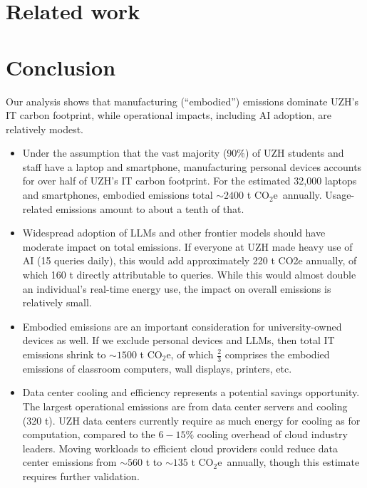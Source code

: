 \documentclass[11pt]{article}
\newcommand{\coe}{CO$_2$e}
\begin{document}
\section{Related work}
\label{sec:related:work}

\section{Conclusion}

Our analysis shows that manufacturing (“embodied”) emissions dominate UZH's IT carbon footprint, while operational impacts, including AI adoption, are relatively modest.

\begin{itemize}

  \item Under the assumption that the vast majority (90\%) of UZH students and staff have a laptop and smartphone, manufacturing personal devices accounts for over half of UZH's IT carbon footprint. For the estimated 32,000 laptops and smartphones, embodied emissions total $\sim 2400$ t \coe\ annually. Usage-related emissions amount to about a tenth of that.

  \item Widespread adoption of LLMs and other frontier models should have moderate impact on total emissions. If everyone at UZH made heavy use of AI (15 queries daily), this would add approximately 220 t CO2e annually, of which 160 t directly attributable to queries. While this would almost double an individual's real-time energy use, the impact on overall emissions is relatively small.

  \item Embodied emissions are an important consideration for university-owned devices as well. If we exclude personal devices and LLMs, then total IT emissions shrink to $\sim 1500$ t \coe, of which $\frac{2}{3}$ comprises the embodied emissions of classroom computers, wall displays, printers, etc.

  \item Data center cooling and efficiency represents a potential savings opportunity. The largest operational emissions are from data center servers and cooling (320 t). UZH data centers currently require as much energy for cooling as for computation, compared to the $6-15\%$ cooling overhead of cloud industry leaders. Moving workloads to efficient cloud providers could reduce data center emissions from $\sim 560$ t to $\sim 135$ t \coe\ annually, though this estimate requires further validation.

\end{itemize}

\printbibliography
\end{document}
